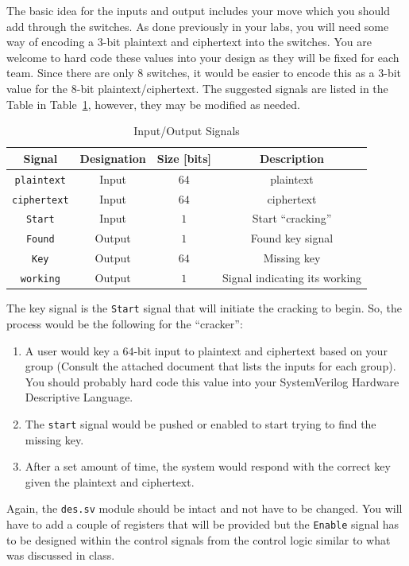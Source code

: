 \documentclass{article}
\begin{document}
The basic idea for the inputs and output includes your move which you
should add through the switches.  As done previously in your labs, you
will need some way of encoding a $3$-bit plaintext and ciphertext into
the switches.  You are welcome to hard code these values into your
design as they will be fixed for each team.  
Since there are only $8$ switches, it would be easier to encode this
as a $3$-bit value for the $8$-bit plaintext/ciphertext.
The suggested signals are listed in the Table in
Table~\ref{io.tbl}, however, they may be modified as needed.
\begin{table}
  \centering
  \begin{tabular}{|c|c|c|c|} \hline
    Signal & Designation & Size [bits] & Description \\ \hline
    \verb!plaintext!  & Input  & $64$  & plaintext \\ \hline
    \verb!ciphertext! & Input  & $64$  & ciphertext \\ \hline
    \verb!Start!      & Input  & $1$  & Start ``cracking'' \\ \hline
    \verb!Found!      & Output & $1$  & Found key signal \\ \hline
    \verb!Key!        & Output & $64$ & Missing key \\ \hline
    \verb!working!    & Output & $1$  & Signal indicating its working \\ \hline
  \end{tabular}
  \caption{Input/Output Signals}
  \label{io.tbl}
\end{table}

The key signal is the \verb!Start! signal that will initiate the
cracking to begin.  So,
the process would be the following for the ``cracker'':
\begin{enumerate}
\item A user would key a $64$-bit input to plaintext and ciphertext
  based on your group (Consult the attached document that lists the
  inputs for each group).  You should probably hard code this value
  into your SystemVerilog Hardware Descriptive Language.
\item The \verb!start! signal would be pushed or enabled to start
  trying to find the missing key.
\item After a set amount of time, the system would respond with the
  correct key given the plaintext and ciphertext.
\end{enumerate}
Again, the \verb!des.sv! module should be intact and not have to
be changed.   You will have to add a couple of registers that will
be provided but the \verb!Enable! signal
has to be designed within the control
signals from the control logic similar to what was discussed in
class.
\end{document}
